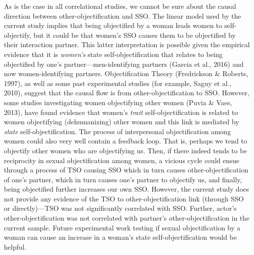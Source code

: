 \documentclass[man]{apa6}
\begin{document}
As is the case in all correlational studies, we cannot be sure about the
causal direction between other-objectification and SSO. The linear model
used by the current study implies that being objectified by a woman
leads women to self-objectify, but it could be that women's SSO causes
them to be objectified by their interaction partner. This latter
interpretation is possible given the empirical evidence that it is
\emph{women's} state self-objectification that relates to being
objectified by one's partner---men-identifying partners (Garcia et al.,
2016) and now women-identifying partners. Objectification Theory
(Fredrickson \& Roberts, 1997), as well as some past experimental
studies (for example, Saguy et al., 2010), suggest that the causal flow
is from other-objectification to SSO. However, some studies
investigating women objectifying other women (Puvia \& Vaes, 2013), have
found evidence that women's \emph{trait} self-objectification is related
to women objectifying (dehumanizing) other women and this link is
mediated by \emph{state} self-objectification. The process of
interpersonal objectification among women could also very well contain a
feedback loop. That is, perhaps we tend to objectify other women who are
objectifying us. Then, if there indeed tends to be reciprocity in sexual
objectification among women, a vicious cycle could ensue through a
process of TSO causing SSO which in turn causes other-objectification of
one's partner, which in turn causes one's partner to objectify us, and
finally, being objectified further increases our own SSO. However, the
current study does not provide any evidence of the TSO to
other-objectification link (through SSO or directly)---TSO was not
significantly correlated with SSO. Further, actor's
other-objectification was not correlated with partner's
other-objectification in the current sample. Future experimental work
testing if sexual objectification by a woman can cause an increase in a
woman's state self-objectification would be helpful.
\end{document}
